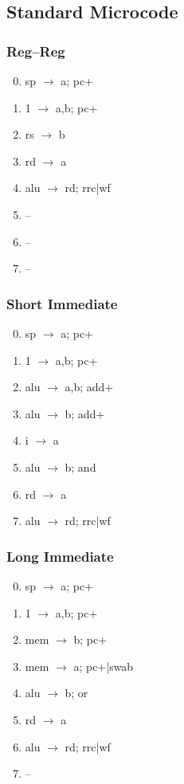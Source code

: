 \documentclass[11pt]{book}
\begin{document}
\subsection*{Standard Microcode}
\begin{multicols}{3}\ttfamily\selectfont\small
  \subsubsection*{Reg--Reg}
  \begin{enumerate}\setcounter{enumi}{-1}
  \item sp \(\rightarrow\) a; pc+
  \item 1 \(\rightarrow\) a,b; pc+
  \item rs \(\rightarrow\) b
  \item rd \(\rightarrow\) a
  \item alu \(\rightarrow\) rd; rrc|wf
  \item --
  \item --
  \item --
  \end{enumerate}
  \columnbreak
  \subsubsection*{Short Immediate}
  \begin{enumerate}\setcounter{enumi}{-1}
  \item sp \(\rightarrow\) a; pc+
  \item 1 \(\rightarrow\) a,b; pc+
  \item alu \(\rightarrow\) a,b; add+
  \item alu \(\rightarrow\) b; add+
  \item i \(\rightarrow\) a
  \item alu \(\rightarrow\) b; and
  \item rd \(\rightarrow\) a
  \item alu \(\rightarrow\) rd; rrc|wf
  \end{enumerate}
  \columnbreak
  \subsubsection*{Long Immediate}
  \begin{enumerate}\setcounter{enumi}{-1}
  \item sp \(\rightarrow\) a; pc+
  \item 1 \(\rightarrow\) a,b; pc+
  \item mem \(\rightarrow\) b; pc+
  \item mem \(\rightarrow\) a; pc+|swab
  \item alu \(\rightarrow\) b; or
  \item rd \(\rightarrow\) a
  \item alu \(\rightarrow\) rd; rrc|wf
  \item --
  \end{enumerate}
\end{multicols}
\end{document}
